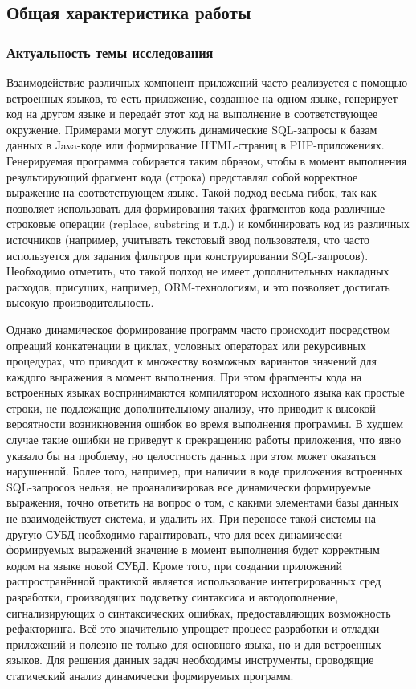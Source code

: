 \subsection*{\Large Общая характеристика работы}
\fontsize{14pt}{15pt}\selectfont
\subsubsection*{\large{Актуальность темы исследования}}

Взаимодействие различных компонент приложений часто реализуется с помощью встроенных языков, то есть приложение, созданное на одном языке, генерирует код на другом языке и передаёт этот код на выполнение в соответствующее окружение. Примерами могут служить динамические SQL-запросы к базам данных в Java-коде или формирование HTML-страниц в PHP-приложениях. Генерируемая программа собирается таким образом, чтобы в момент выполнения результирующий фрагмент кода (строка) представлял собой корректное выражение на соответствующем языке. Такой подход весьма гибок, так как позволяет использовать для формирования таких фрагментов кода различные строковые операции (replace, substring и т.д.) и комбинировать код из различных источников (например, учитывать текстовый ввод пользователя, что часто используется для задания фильтров при конструировании SQL-запросов). Необходимо отметить, что такой подход не имеет дополнительных накладных расходов, присущих, например, ORM-технологиям, и это позволяет достигать высокую производительность. 

Однако динамическое формирование программ часто происходит посредством опреаций конкатенации в циклах, условных операторах или рекурсивных процедурах, что приводит к множеству возможных вариантов значений для каждого выражения в момент выполнения. При этом фрагменты кода на встроенных языках воспринимаются компилятором исходного языка как простые строки, не подлежащие дополнительному анализу, что приводит к высокой вероятности возникновения ошибок во время выполнения программы. В худшем случае такие ошибки не приведут к прекращению работы приложения, что явно указало бы на проблему, но целостность данных при этом может оказаться нарушенной. Более того, например, при наличии в коде приложения встроенных SQL-запросов нельзя, не проанализировав все динамически формируемые выражения, точно ответить на вопрос о том, с какими элементами базы данных не взаимодействует система, и  удалить их. При переносе такой системы на другую СУБД необходимо гарантировать, что для всех динамически формируемых выражений значение в момент выполнения будет корректным кодом на языке новой СУБД. Кроме того, при создании приложений распространённой практикой является использование интегрированных сред разработки, производящих подсветку синтаксиса и автодополнение, сигнализирующих о синтаксических ошибках, предоставляющих возможность рефакторинга. Всё это значительно упрощает процесс разработки и отладки приложений и полезно не только для основного языка, но и для встроенных языков. Для решения данных задач необходимы инструменты, проводящие статический анализ динамически формируемых программ.  

